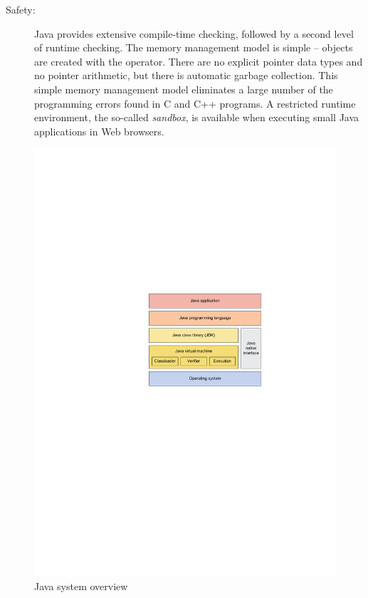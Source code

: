 \begin{description}
    \item[Safety:]
Java provides extensive compile-time checking, followed by a second
level of runtime checking. The memory management model is simple --
objects are created with the  operator. There are no
explicit pointer data types and no pointer arithmetic, but there is
automatic garbage collection. This simple memory management model
eliminates a large number of the programming errors found in C and
C++ programs. A restricted runtime environment, the so-called
\emph{sandbox}, is available when executing small Java applications
in Web browsers.

\end{description}
%
\begin{figure}
    \centering
    \includegraphics[scale=\picscale]{intro/java_overview}
    \caption{Java system overview}
    \label{fig:java:overview}
\end{figure}
